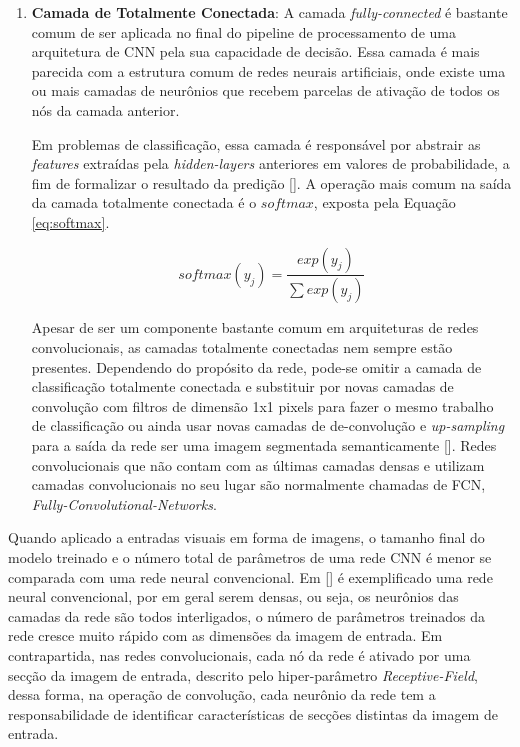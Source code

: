 \begin{enumerate}
    \item \textbf{Camada de Totalmente Conectada}:
            A camada \textit{fully-connected} é bastante comum de ser aplicada no final do pipeline de processamento de uma arquitetura de CNN pela sua capacidade de decisão. Essa camada é mais parecida com a estrutura comum de redes neurais artificiais, onde existe uma ou mais camadas de neurônios que recebem parcelas de ativação de todos os nós da camada anterior.
            
            Em problemas de classificação, essa camada é responsável por abstrair as \textit{features} extraídas pela \textit{hidden-layers} anteriores em valores de probabilidade, a fim de formalizar o resultado da predição []. A operação mais comum na saída da camada totalmente conectada é o $softmax$, exposta pela Equação \ref{eq:softmax}.
            
            \begin{equation}
                \label{eq:softmax}
                softmax(y_j) = \frac{exp(y_j)}{\sum exp(y_j)}
            \end{equation}
            
            Apesar de ser um componente bastante comum em arquiteturas de redes convolucionais, as camadas totalmente conectadas nem sempre estão presentes. Dependendo do propósito da rede, pode-se omitir a camada de classificação totalmente conectada e substituir por novas camadas de convolução com filtros de dimensão 1x1 pixels para fazer o mesmo trabalho de classificação ou ainda usar novas camadas de de-convolução e \textit{up-sampling} para a saída da rede ser uma imagem segmentada semanticamente []. Redes convolucionais que não contam com as últimas camadas densas e utilizam camadas convolucionais no seu lugar são normalmente chamadas de FCN, \textit{Fully-Convolutional-Networks}.
\end{enumerate}

Quando aplicado a entradas visuais em forma de imagens, o tamanho final do modelo treinado e o número total de parâmetros de uma rede CNN é menor se comparada com uma rede neural convencional. Em [] é exemplificado uma rede neural convencional, por em geral serem densas, ou seja, os neurônios das camadas da rede são todos interligados, o número de parâmetros treinados da rede cresce muito rápido com as dimensões da imagem de entrada. Em contrapartida, nas redes convolucionais, cada nó da rede é ativado por uma secção da imagem de entrada, descrito pelo hiper-parâmetro \textit{Receptive-Field}, dessa forma, na operação de convolução, cada neurônio da rede tem a responsabilidade de identificar características de secções distintas da imagem de entrada.

